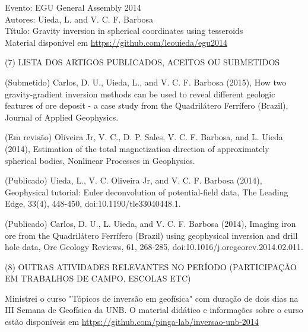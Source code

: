 \documentclass[12pt,a4paper]{article}
\begin{document}
\begin{flushleft}
\bigskip

Evento: EGU General Assembly 2014\\
Autores: Uieda, L. and V. C. F. Barbosa\\
Título: Gravity inversion in spherical coordinates using tesseroids\\
Material disponível em
\href{https://github.com/leouieda/egu2014}{https://github.com/leouieda/egu2014}

\bigskip

\noindent (7) LISTA DOS ARTIGOS PUBLICADOS, ACEITOS OU SUBMETIDOS

\bigskip

(Submetido) Carlos, D. U., Uieda, L., and V. C. F. Barbosa (2015),
How two gravity-gradient inversion methods can be used to reveal different
geologic features of ore deposit - a case study from the Quadrilátero
Ferrífero (Brazil),
Journal of Applied Geophysics.

\bigskip

(Em revisão) Oliveira Jr, V. C., D. P. Sales, V. C. F. Barbosa, and L. Uieda (2014),
Estimation of the total magnetization direction of approximately spherical
bodies, Nonlinear Processes in Geophysics.

\bigskip

(Publicado) Uieda, L., V. C. Oliveira Jr, and V. C. F. Barbosa (2014), Geophysical
tutorial: Euler deconvolution of potential-field data, The Leading Edge, 33(4),
448-450, doi:10.1190/tle33040448.1.

\bigskip

(Publicado) Carlos, D. U., L. Uieda, and V. C. F. Barbosa (2014), Imaging iron ore from the
Quadrilátero Ferrífero (Brazil) using geophysical inversion and drill hole
data, Ore Geology Reviews, 61, 268-285, doi:10.1016/j.oregeorev.2014.02.011.

\bigskip

\noindent (8) OUTRAS ATIVIDADES RELEVANTES NO PERÍODO (PARTICIPAÇÃO EM
TRABALHOS DE CAMPO, ESCOLAS ETC)

\bigskip

Ministrei o curso "Tópicos de inversão em geofísica" com duração de dois dias
na III Semana de Geofísica da UNB.
O material didático e informações sobre o curso estão disponíveis em
\href{https://github.com/pinga-lab/inversao-unb-2014}{https://github.com/pinga-lab/inversao-unb-2014}


\bigskip

\end{flushleft}
\end{document}
